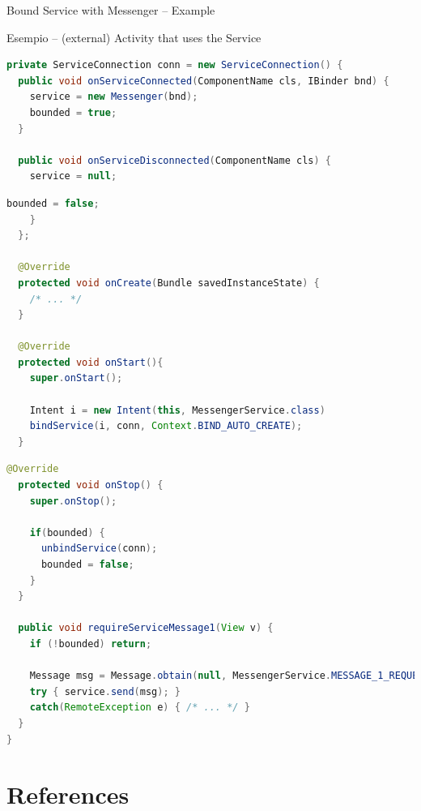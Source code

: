 \documentclass{beamer}
\begin{document}
\begin{frame}{Bound Service with Messenger -- Example}
\begin{exampleblock}{Esempio -- (external) Activity that uses the Service}
\begin{lstlisting}[language=Java]
private ServiceConnection conn = new ServiceConnection() {
  public void onServiceConnected(ComponentName cls, IBinder bnd) {
    service = new Messenger(bnd);
    bounded = true;
  }
  
  public void onServiceDisconnected(ComponentName cls) {
    service = null;
      \end{lstlisting}
    \end{exampleblock}  
    \begin{exampleblock}{\vspace{-10pt}}
      \begin{lstlisting}[language=Java]    
      bounded = false;
    }
  };

  @Override
  protected void onCreate(Bundle savedInstanceState) {
    /* ... */
  }

  @Override
  protected void onStart(){
    super.onStart();
    
    Intent i = new Intent(this, MessengerService.class)
    bindService(i, conn, Context.BIND_AUTO_CREATE);
  }
      \end{lstlisting}
    \end{exampleblock}  
    \begin{exampleblock}{\vspace{-10pt}}
      \begin{lstlisting}[language=Java]
  @Override
  protected void onStop() {
    super.onStop();

    if(bounded) {
      unbindService(conn);
      bounded = false;
    }
  }

  public void requireServiceMessage1(View v) {
    if (!bounded) return;
    
    Message msg = Message.obtain(null, MessengerService.MESSAGE_1_REQUEST, 0, 0); 
    try { service.send(msg); } 
    catch(RemoteException e) { /* ... */ }
  }
}    
      \end{lstlisting}
    \end{exampleblock}
  \end{frame}

\section*{References}

\end{document}

